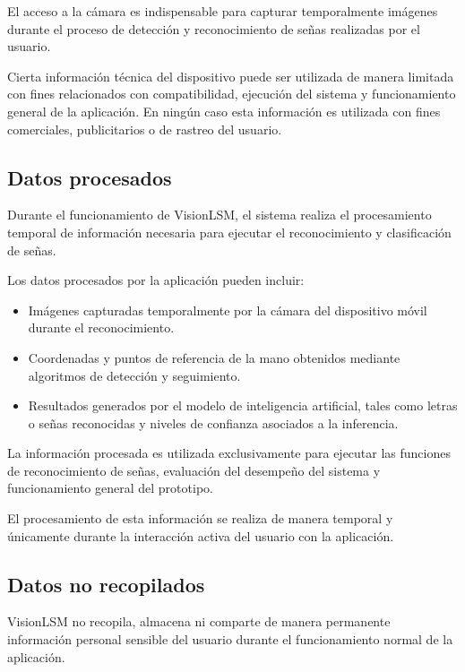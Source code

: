 	El acceso a la cámara es indispensable para capturar temporalmente imágenes durante el proceso de detección y reconocimiento de señas realizadas por el usuario.
	
	Cierta información técnica del dispositivo puede ser utilizada de manera limitada con fines relacionados con compatibilidad, ejecución del sistema y funcionamiento general de la aplicación. En ningún caso esta información es utilizada con fines comerciales, publicitarios o de rastreo del usuario.
	
	\subsection{Datos procesados}
	
	Durante el funcionamiento de VisionLSM, el sistema realiza el procesamiento temporal de información necesaria para ejecutar el reconocimiento y clasificación de señas.
	
	Los datos procesados por la aplicación pueden incluir:
	
	\begin{itemize}
		\item Imágenes capturadas temporalmente por la cámara del dispositivo móvil durante el reconocimiento.
		
		\item Coordenadas y puntos de referencia de la mano obtenidos mediante algoritmos de detección y seguimiento.
		
		\item Resultados generados por el modelo de inteligencia artificial, tales como letras o señas reconocidas y niveles de confianza asociados a la inferencia.
	\end{itemize}
	
	La información procesada es utilizada exclusivamente para ejecutar las funciones de reconocimiento de señas, evaluación del desempeño del sistema y funcionamiento general del prototipo.
	
	El procesamiento de esta información se realiza de manera temporal y únicamente durante la interacción activa del usuario con la aplicación.
	
	\subsection{Datos no recopilados}
	
	VisionLSM no recopila, almacena ni comparte de manera permanente información personal sensible del usuario durante el funcionamiento normal de la aplicación.
	
